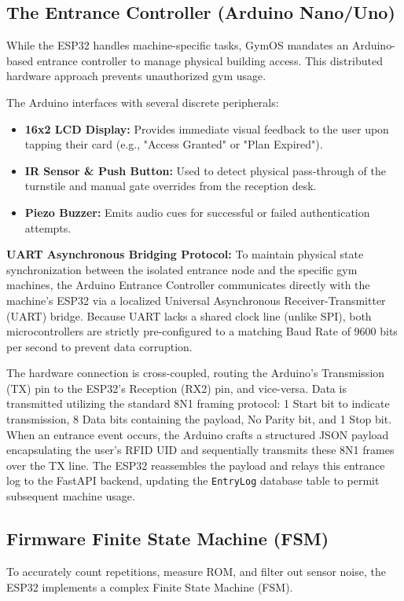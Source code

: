 \documentclass[conference]{IEEEtran}
\begin{document}
\subsection{The Entrance Controller (Arduino Nano/Uno)}
While the ESP32 handles machine-specific tasks, GymOS mandates an Arduino-based entrance controller to manage physical building access. This distributed hardware approach prevents unauthorized gym usage.

The Arduino interfaces with several discrete peripherals:
\begin{itemize}
    \item \textbf{16x2 LCD Display:} Provides immediate visual feedback to the user upon tapping their card (e.g., "Access Granted" or "Plan Expired").
    \item \textbf{IR Sensor \& Push Button:} Used to detect physical pass-through of the turnstile and manual gate overrides from the reception desk.
    \item \textbf{Piezo Buzzer:} Emits audio cues for successful or failed authentication attempts.
\end{itemize}

\textbf{UART Asynchronous Bridging Protocol:} To maintain physical state synchronization between the isolated entrance node and the specific gym machines, the Arduino Entrance Controller communicates directly with the machine's ESP32 via a localized Universal Asynchronous Receiver-Transmitter (UART) bridge. Because UART lacks a shared clock line (unlike SPI), both microcontrollers are strictly pre-configured to a matching Baud Rate of 9600 bits per second to prevent data corruption. 

The hardware connection is cross-coupled, routing the Arduino's Transmission (TX) pin to the ESP32's Reception (RX2) pin, and vice-versa. Data is transmitted utilizing the standard 8N1 framing protocol: 1 Start bit to indicate transmission, 8 Data bits containing the payload, No Parity bit, and 1 Stop bit. When an entrance event occurs, the Arduino crafts a structured JSON payload encapsulating the user's RFID UID and sequentially transmits these 8N1 frames over the TX line. The ESP32 reassembles the payload and relays this entrance log to the FastAPI backend, updating the \texttt{EntryLog} database table to permit subsequent machine usage.

\subsection{Firmware Finite State Machine (FSM)}
To accurately count repetitions, measure ROM, and filter out sensor noise, the ESP32 implements a complex Finite State Machine (FSM). 
\end{document}
